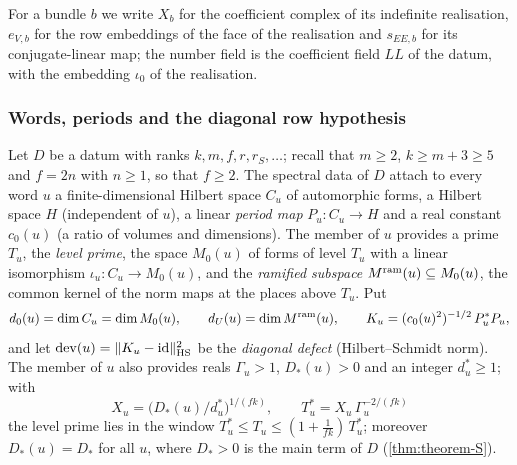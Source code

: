 For a bundle $b$ we write $X_b$ for the coefficient complex of its indefinite realisation, $e_{V,b}$ for the row
embeddings of the face of the realisation and $s_{EE,b}$ for its conjugate-linear map; the number field is the
coefficient field $\mathit{LL}$ of the datum, with the embedding $\iota_0$ of the realisation.

\subsubsection{Words, periods and the diagonal row hypothesis}\label{sec:pf:open0a:words}
Let $D$ be a datum with ranks $k,m,f,r,r_S,\dots$; recall that $m\ge2$, $k\ge m+3\ge5$ and $f=2n$ with $n\ge1$, so
that $f\ge2$. The spectral data of $D$ attach to every word $u$ a finite-dimensional Hilbert space $C_u$ of
automorphic forms, a Hilbert space $H$ (independent of $u$), a linear \emph{period map} $P_u\colon C_u\to H$ and a
real constant $c_0(u)$ (a ratio of volumes and dimensions). The member of $u$ provides a prime $T_u$, the \emph{level
prime}, the space $M_0(u)$ of forms of level $T_u$ with a linear isomorphism $\iota_u\colon C_u\to M_0(u)$, and the
\emph{ramified subspace} $M^{\mathrm{ram}}(u)\subseteq M_0(u)$, the common kernel of the norm maps at the places above
$T_u$. Put
\[
d_0(u)=\dim C_u=\dim M_0(u),\qquad d_U(u)=\dim M^{\mathrm{ram}}(u),\qquad K_u=(c_0(u)^2)^{-1/2}\,P_u^*P_u,
\]
and let $\operatorname{dev}(u)=\|K_u-\mathrm{id}\|_{\mathrm{HS}}^2$ be the \emph{diagonal defect} (Hilbert--Schmidt norm). The
member of $u$ also provides reals $\Gamma_u>1$, $D_*(u)>0$ and an integer $d_u^*\ge1$; with
\begin{equation}\label{pf:open0a:eq:Tstar}
X_u=\bigl(D_*(u)/d_u^*\bigr)^{1/(fk)},\qquad T_u^*=X_u\,\Gamma_u^{-2/(fk)}
\end{equation}
the level prime lies in the window $T_u^*\le T_u\le(1+\frac1{fk})\,T_u^*$; moreover $D_*(u)=D_*$ for all $u$, where
$D_*>0$ is the main term of $D$ (\cref{thm:theorem-S}).


